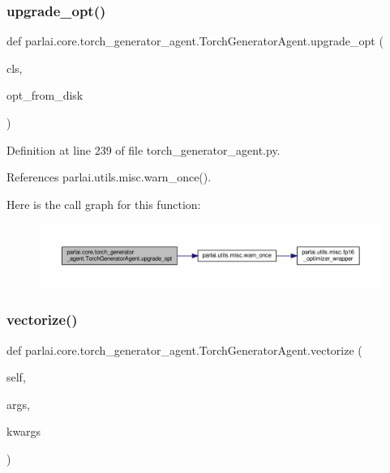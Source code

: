 \subsubsection{\texorpdfstring{upgrade\+\_\+opt()}{upgrade\_opt()}}
{\footnotesize\ttfamily def parlai.\+core.\+torch\+\_\+generator\+\_\+agent.\+Torch\+Generator\+Agent.\+upgrade\+\_\+opt (\begin{DoxyParamCaption}\item[{}]{cls,  }\item[{}]{opt\+\_\+from\+\_\+disk }\end{DoxyParamCaption})}



Definition at line 239 of file torch\+\_\+generator\+\_\+agent.\+py.



References parlai.\+utils.\+misc.\+warn\+\_\+once().

Here is the call graph for this function\+:
\nopagebreak
\begin{figure}[H]
\begin{center}
\leavevmode
\includegraphics[width=350pt]{classparlai_1_1core_1_1torch__generator__agent_1_1TorchGeneratorAgent_a8bb3183c7de0e8831157536c6ce1751b_cgraph}
\end{center}
\end{figure}
\mbox{\label{classparlai_1_1core_1_1torch__generator__agent_1_1TorchGeneratorAgent_a66f36d7201bc1b9a019d3525a5934cf7}} 
\subsubsection{\texorpdfstring{vectorize()}{vectorize()}}
{\footnotesize\ttfamily def parlai.\+core.\+torch\+\_\+generator\+\_\+agent.\+Torch\+Generator\+Agent.\+vectorize (\begin{DoxyParamCaption}\item[{}]{self,  }\item[{}]{args,  }\item[{}]{kwargs }\end{DoxyParamCaption})}

